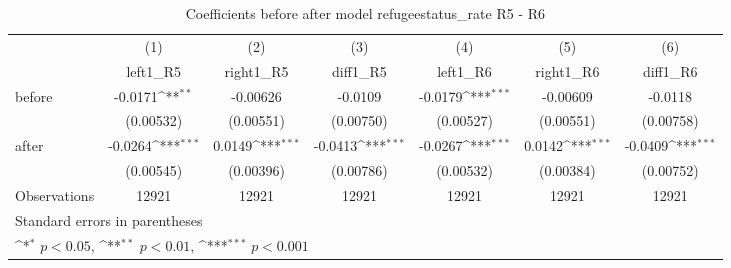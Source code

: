 \begin{table}[htbp]\centering
\def\sym#1{\ifmmode^{#1}\else\(^{#1}\)\fi}
\caption{Coefficients before after model refugeestatus\_rate R5 - R6}
\begin{tabular}{l*{6}{c}}
\hline\hline
                    &\multicolumn{1}{c}{(1)}&\multicolumn{1}{c}{(2)}&\multicolumn{1}{c}{(3)}&\multicolumn{1}{c}{(4)}&\multicolumn{1}{c}{(5)}&\multicolumn{1}{c}{(6)}\\
                    &\multicolumn{1}{c}{left1\_R5}&\multicolumn{1}{c}{right1\_R5}&\multicolumn{1}{c}{diff1\_R5}&\multicolumn{1}{c}{left1\_R6}&\multicolumn{1}{c}{right1\_R6}&\multicolumn{1}{c}{diff1\_R6}\\
\hline
before              &     -0.0171\sym{**} &    -0.00626         &     -0.0109         &     -0.0179\sym{***}&    -0.00609         &     -0.0118         \\
                    &   (0.00532)         &   (0.00551)         &   (0.00750)         &   (0.00527)         &   (0.00551)         &   (0.00758)         \\
[1em]
after               &     -0.0264\sym{***}&      0.0149\sym{***}&     -0.0413\sym{***}&     -0.0267\sym{***}&      0.0142\sym{***}&     -0.0409\sym{***}\\
                    &   (0.00545)         &   (0.00396)         &   (0.00786)         &   (0.00532)         &   (0.00384)         &   (0.00752)         \\
\hline
Observations        &       12921         &       12921         &       12921         &       12921         &       12921         &       12921         \\
\hline\hline
\multicolumn{7}{l}{\footnotesize Standard errors in parentheses}\\
\multicolumn{7}{l}{\footnotesize \sym{*} \(p<0.05\), \sym{**} \(p<0.01\), \sym{***} \(p<0.001\)}\\
\end{tabular}
\end{table}
